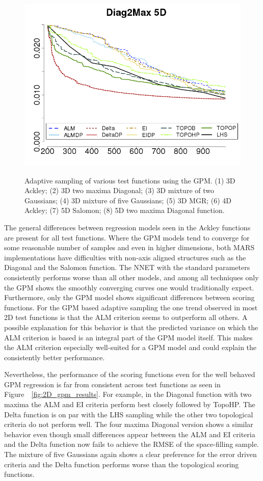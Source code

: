 \begin{figure}[htbp]
\begin{center}
 \includegraphics[width=0.24\linewidth]{figs/chap5/gpm_Diag2Max_5D_td=200}\label{fig:2diag5D_gpm}
\caption{Adaptive sampling of various test functions using the GPM.
%
(1)  3D Ackley;
(2) 3D two maxima Diagonal;
(3) 3D mixture of two Gaussians;
(4) 3D mixture of five Gaussians;
(5) 3D MGR;
(6) 4D Ackley;
(7) 5D Salomon;
(8) 5D two maxima Diagonal function.}
\label{fig:345D_gpm}
\end{center}
\end{figure}

The general differences between regression models seen in the Ackley functions are present for all test functions.
%
Where the GPM models tend to converge for some reasonable number of samples and even in higher dimensions, both MARS implementations have difficulties with non-axis aligned structures such as the Diagonal and the Salomon function.
%
The NNET with the standard parameters consistently performs worse than all other models, and among all techniques only the GPM shows the smoothly converging curves one would traditionally expect.
%
Furthermore, only the GPM model shows significant differences between scoring functions.
%
For the GPM based adaptive sampling the one trend observed in most 2D test functions is that the ALM criterion seems to outperform all others.
%
A possible explanation for this behavior is that the predicted variance on which the ALM criterion is based is an integral part of the GPM model itself.
%
This makes the ALM criterion especially well-suited for a GPM model and could explain the consistently better performance.

Nevertheless, the performance of the scoring functions even for the well behaved GPM regression is far from consistent across test functions as seen in Figure~~\ref{fig:2D_gpm_results}.
%
For example, in the Diagonal function with two maxima the ALM and EI criteria perform best closely followed by TopoHP.
%
The Delta function is on par with the LHS sampling while the other two topological criteria do not perform well.
%
The four maxima Diagonal version shows a similar behavior even though small differences appear between the ALM and EI criteria and the Delta function now fails to achieve the RMSE of the space-filling sample.
%
The mixture of five Gaussians again shows a clear preference for the error driven criteria and the Delta function performs worse than the topological scoring functions.

